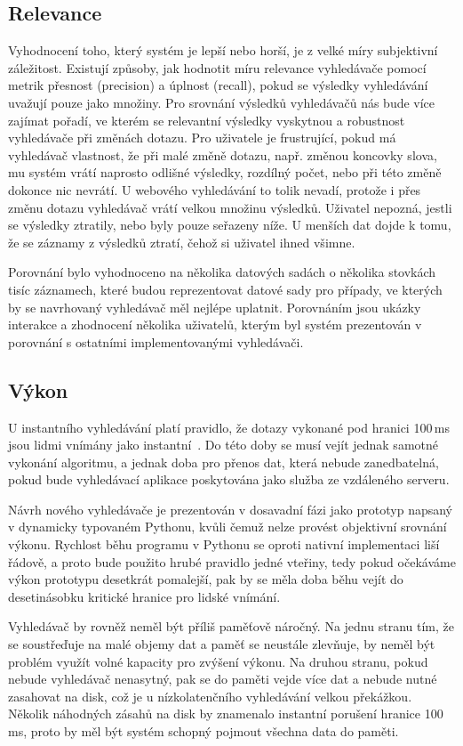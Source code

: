 \documentclass[11pt,letterpaper,oneside,openright]{book}
\begin{document}
\subsection{Relevance}
Vyhodnocení toho, který systém je lepší nebo horší, je z velké míry subjektivní
záležitost. Existují způsoby, jak hodnotit míru relevance vyhledávače pomocí
metrik přesnost (precision) a úplnost (recall), pokud se výsledky vyhledávání
uvažují pouze jako množiny. Pro srovnání výsledků vyhledávačů nás bude více
zajímat pořadí, ve kterém se relevantní výsledky vyskytnou a robustnost
vyhledávače při změnách dotazu. Pro uživatele je frustrující, pokud má
vyhledávač vlastnost, že při malé změně dotazu, např. změnou koncovky slova, mu
systém vrátí naprosto odlišné výsledky, rozdílný počet, nebo při této změně
dokonce nic nevrátí. U webového vyhledávání to tolik nevadí, protože i přes
změnu dotazu vyhledávač vrátí velkou množinu výsledků. Uživatel nepozná, jestli
se výsledky ztratily, nebo byly pouze seřazeny níže. U menších dat dojde k
tomu, že se záznamy z výsledků ztratí, čehož si uživatel ihned všimne.

Porovnání bylo vyhodnoceno na několika datových sadách o několika stovkách
tisíc záznamech, které budou reprezentovat datové sady pro případy, ve kterých
by se navrhovaný vyhledávač měl nejlépe uplatnit. Porovnáním jsou ukázky
interakce a zhodnocení několika uživatelů, kterým byl systém prezentován v
porovnání s ostatními implementovanými vyhledávači.

\subsection{Výkon}
U instantního vyhledávání platí pravidlo, že dotazy vykonané pod hranici
100\,ms jsou lidmi vnímány jako instantní~\cite{sto_ms}. Do této doby se musí
vejít jednak samotné vykonání algoritmu, a jednak doba pro přenos dat, která
nebude zanedbatelná, pokud bude vyhledávací aplikace poskytována jako služba ze
vzdáleného serveru.

Návrh nového vyhledávače je prezentován v dosavadní fázi jako prototyp napsaný
v dynamicky typovaném Pythonu, kvůli čemuž nelze provést objektivní srovnání
výkonu. Rychlost běhu programu v Pythonu se oproti nativní implementaci liší
řádově, a proto bude použito hrubé pravidlo jedné vteřiny, tedy pokud očekáváme
výkon prototypu desetkrát pomalejší, pak by se měla doba běhu vejít do
desetinásobku kritické hranice pro lidské vnímání.

Vyhledávač by rovněž neměl být příliš paměťově náročný. Na jednu stranu tím, že
se soustřeďuje na malé objemy dat a paměť se neustále zlevňuje, by neměl být
problém využít volné kapacity pro zvýšení výkonu. Na druhou stranu, pokud
nebude vyhledávač nenasytný, pak se do paměti vejde více dat a nebude nutné
zasahovat na disk, což je u nízkolatenčního vyhledávání velkou překážkou.
Několik náhodných zásahů na disk by znamenalo instantní porušení hranice
100\,ms, proto by měl být systém schopný pojmout všechna data do paměti.
\end{document}
